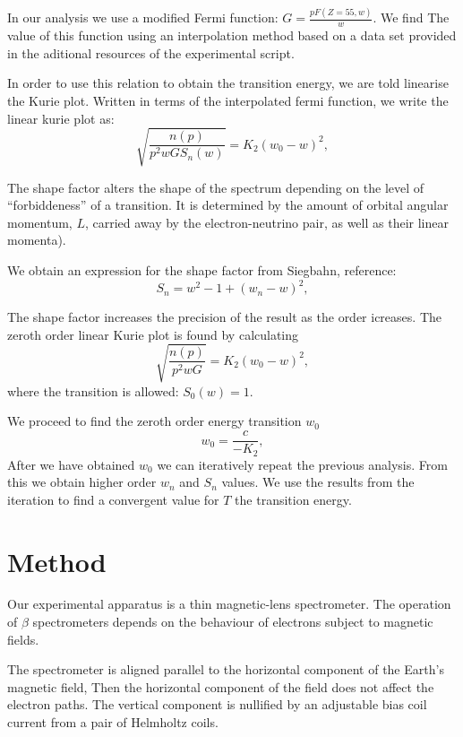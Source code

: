 \documentclass[10pt, a4paper]{article}
\begin{document}
\begin{multicols}{2}
In our analysis we use a modified Fermi function: 
$G = \frac{p F(Z=55, w)}{w}$. We find The value of this function using an interpolation method based on a data set provided in the aditional resources of the experimental script.

In order to use this relation to obtain the transition energy, we are told linearise the Kurie plot. 
Written in terms of the interpolated fermi function, we write the linear kurie plot as:
\begin{equation} \sqrt{\frac{n(p)}{p^2 w G S_n(w)}}= K_2 (w_0 - w)^2,
\end{equation}

The shape factor alters the shape of the spectrum depending on the level of “forbiddeness” of a transition. It is determined by the amount of orbital angular momentum, $L$, carried away by the electron-neutrino pair, as well as their linear momenta)\cite{NERS312}.

We obtain an expression for the shape factor from Siegbahn, reference\cite{Siegbahn}:
\begin{equation} S_n = w^2 - 1 + (w_n - w)^2,
\end{equation} 

The shape factor increases the precision of the result as the order icreases. The zeroth order linear Kurie plot is found by calculating
\begin{equation} \sqrt{\frac{n(p)}{p^2 w G}}= K_2 (w_0 - w)^2,
\end{equation}
where the transition is allowed: $S_0(w) = 1.$

We proceed to find the zeroth order energy transition $w_0$ 
\begin{equation} w_0 = \frac{c}{-K_2},
\end{equation}
After we have obtained $w_0$ we can iteratively repeat the previous analysis. 
From this we obtain higher order $w_n$ and $S_n$ values. We use the results from the iteration to find a convergent value for $T$ the transition energy.


\section{Method}

Our experimental apparatus is a thin magnetic-lens spectrometer. 
The operation of $\beta$ spectrometers depends on the behaviour of electrons subject to magnetic fields. 

The spectrometer is aligned parallel to the horizontal component of the Earth's magnetic field, Then the horizontal component of the field does not affect the electron paths. The vertical component is nullified by an adjustable bias coil current from a pair of Helmholtz coils.


\end{multicols}
\end{document}
